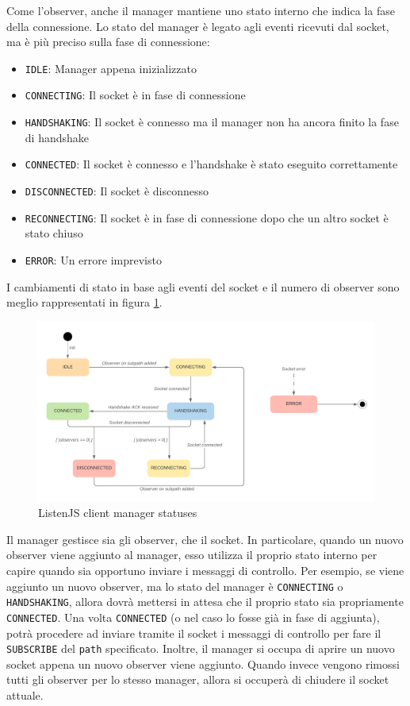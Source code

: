 \documentclass[12pt,a4paper,openright,twoside]{report}
\begin{document}
Come l'observer, anche il manager mantiene uno stato interno che indica la fase della connessione. Lo stato del manager è legato agli eventi ricevuti dal socket, ma è più preciso sulla fase di connessione:
\begin{itemize}
\item \lstinline{IDLE}: Manager appena inizializzato
\item \lstinline{CONNECTING}: Il socket è in fase di connessione
\item \lstinline{HANDSHAKING}: Il socket è connesso ma il manager non ha ancora finito la fase di handshake
\item \lstinline{CONNECTED}: Il socket è connesso e l'handshake è stato eseguito correttamente
\item \lstinline{DISCONNECTED}: Il socket è disconnesso
\item \lstinline{RECONNECTING}: Il socket è in fase di connessione dopo che un altro socket è stato chiuso
\item \lstinline{ERROR}: Un errore imprevisto
\end{itemize}

I cambiamenti di stato in base agli eventi del socket e il numero di observer sono meglio rappresentati in figura \ref{fig:manager_statuses}.

\begin{figure}[htbp]
\centering
\includegraphics[width=.9\textwidth]{assets/manager_statuses.png}
\caption{ListenJS client manager statuses}
\label{fig:manager_statuses}
\end{figure}

Il manager gestisce sia gli observer, che il socket. 
In particolare, quando un nuovo observer viene aggiunto al manager, esso utilizza il proprio stato interno per capire quando sia opportuno inviare i messaggi di controllo. Per esempio, se viene aggiunto un nuovo observer, ma lo stato del manager è \lstinline{CONNECTING} o \lstinline{HANDSHAKING}, allora dovrà mettersi in attesa che il proprio stato sia propriamente \lstinline{CONNECTED}. Una volta \lstinline{CONNECTED} (o nel caso lo fosse già in fase di aggiunta), potrà procedere ad inviare tramite il socket i messaggi di controllo per fare il \lstinline{SUBSCRIBE} del \lstinline{path} specificato.
Inoltre, il manager si occupa di aprire un nuovo socket appena un nuovo observer viene aggiunto. Quando invece vengono rimossi tutti gli observer per lo stesso manager, allora si occuperà di chiudere il socket attuale.
\end{document}
